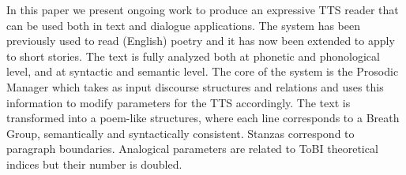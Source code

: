 In this paper we present ongoing work to produce an expressive TTS reader that can be used both in text and dialogue applications. The system has been previously used to read (English) poetry and it has now been extended to apply to short stories. The text is fully analyzed both at phonetic and phonological level, and at syntactic and semantic level. The core of the system is the Prosodic Manager which takes as input discourse structures and relations and uses this information to modify parameters for the TTS accordingly. The text is transformed into a poem-like structures, where each line corresponds to a Breath Group, semantically and syntactically consistent. Stanzas correspond to paragraph boundaries. Analogical parameters are related to ToBI theoretical indices but their number is doubled.
